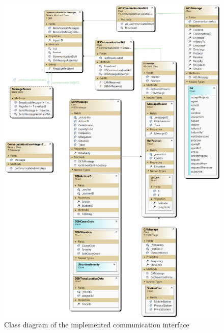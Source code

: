 \documentclass[main.tex]{subfiles}
\begin{document}
\begin{figure}[htbp]
    \centering
    \includegraphics[width=.99\textwidth]{mas-its-communication.png}
    \caption{Class diagram of the implemented communication interface}
    \label{fig-classes-comm}
\end{figure}

\clearpage
\end{document}
